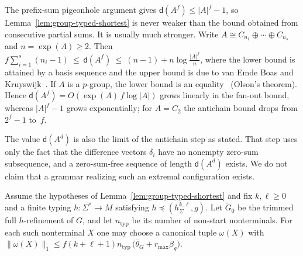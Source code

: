 \begin{remark}
\label{rem:davenport-size}
The prefix-sum pigeonhole argument gives
$\mathsf d(A^f)\le|A|^f-1$, so
Lemma~\ref{lem:group-typed-shortest} is never weaker
than the bound obtained from consecutive partial sums.
It is usually much stronger.  Write
$A\cong C_{n_1}\oplus\cdots\oplus C_{n_s}$ and
$n=\exp(A)\ge2$. Then
\(f\sum_{i=1}^{s}(n_i-1)\ \le\ \mathsf d(A^f)\ \le\
 (n-1)+n\log\frac{|A|^f}{n}\),
where the lower bound is attained by a basis
sequence and the upper bound is due to van Emde Boas
and Kruyswijk~\cite[Proposition~5.1.8 and Theorem~5.5.5]{GeroldingerHalterKoch2006}.
If $A$ is a $p$-group, the lower bound is an
equality~\cite[Theorem~5.5.9]{GeroldingerHalterKoch2006}
(Olson's theorem).
Hence $\mathsf d(A^f)=O(\exp(A)\,f\log|A|)$ grows
linearly in the fan-out bound, whereas $|A|^f-1$ grows
exponentially; for $A=C_2$ the antichain bound drops
from $2^f-1$ to~$f$.

The value $\mathsf d(A^d)$ is also the limit of the
antichain step as stated.  That step uses only the
fact that the difference vectors $\delta_i$ have no
nonempty zero-sum subsequence, and a zero-sum-free
sequence of length $\mathsf d(A^d)$ exists.  We do not
claim that a grammar realizing such an extremal
configuration exists.
\end{remark}

\begin{lemma}
\label{lem:window-abelian-short}
Assume the hypotheses of
Lemma~\ref{lem:group-typed-shortest} and fix
$k,\ell\ge0$ and a finite typing
$h:\Sigma^*\to M$ satisfying
$h\preceq(h_\Sigma^{k,\ell},g)$.
Let $\widetilde G_0$ be the trimmed
full $h$-refinement of $G$, and let
$n_{\mathrm{typ}}$ be its number of
non-start nonterminals. For each such
nonterminal $X$ one may choose a
canonical tuple $\omega(X)$ with
\(\|\omega(X)\|_1\le f(k+\ell+1)n_{\mathrm{typ}}\, \bigl(\bar\theta_G+r_{\max}\beta_g\bigr).\)
\end{lemma}

